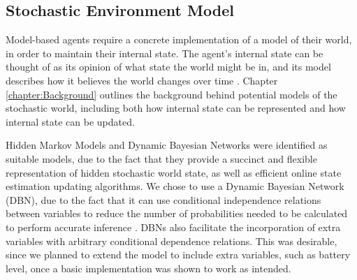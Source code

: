 

\subsection{Stochastic Environment Model}
Model-based agents require a concrete implementation of a model of their world, in order to maintain their internal state. The agent's internal state can be thought of as its opinion of what state the world might be in, and its model describes how it believes the world changes over time \cite{AIAMA}. Chapter \ref{chapter:Background} outlines the background behind potential models of the stochastic world, including both how internal state can be represented and how internal state can be updated.\par
Hidden Markov Models and Dynamic Bayesian Networks were identified as suitable models, due to the fact that they provide a succinct and flexible representation of hidden stochastic world state, as well as efficient online state estimation updating algorithms. We chose to use a Dynamic Bayesian Network (DBN), due to the fact that it can use conditional independence relations between variables to reduce the number of probabilities needed to be calculated to perform accurate inference \cite[p.~63]{KollerPGM}. DBNs also facilitate the incorporation of extra variables with arbitrary conditional dependence relations. This was desirable, since we planned to extend the model to include extra variables, such as battery level, once a basic implementation was shown to work as intended.

